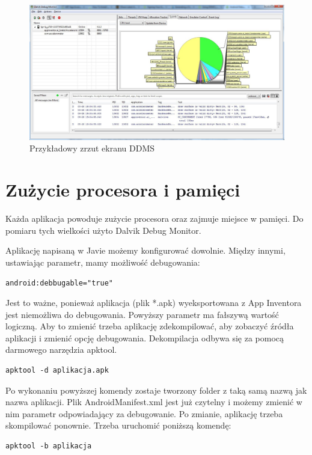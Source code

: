 \begin{figure}[H] 
\centering\includegraphics[width=12cm]{figures/dalvik}
\caption{Przykładowy zrzut ekranu DDMS}
\end{figure}

\section{Zużycie procesora i pamięci}

Każda aplikacja powoduje zużycie procesora oraz zajmuje miejsce w pamięci. Do pomiaru tych wielkości użyto Dalvik Debug Monitor.

Aplikację napisaną w Javie możemy konfigurować dowolnie. Między innymi, ustawiając parametr, mamy możliwość debugowania: 

\begin{lstlisting}
android:debbugable="true"
\end{lstlisting}

Jest to ważne, ponieważ aplikacja (plik *.apk) wyeksportowana z App Inventora jest niemożliwa do debugowania. Powyższy parametr ma fałszywą wartość logiczną. Aby to zmienić trzeba aplikację zdekompilować, aby zobaczyć źródła aplikacji i zmienić opcję debugowania. Dekompilacja odbywa się za pomocą darmowego narzędzia apktool.

\begin{lstlisting}
apktool -d aplikacja.apk
\end{lstlisting}

Po wykonaniu powyższej komendy zostaje tworzony folder z taką samą nazwą jak nazwa aplikacji. Plik AndroidManifest.xml jest już czytelny i możemy zmienić w nim parametr odpowiadający za debugowanie. Po zmianie, aplikację trzeba skompilować ponownie. Trzeba uruchomić poniższą komendę:

\begin{lstlisting}
apktool -b aplikacja
\end{lstlisting}


